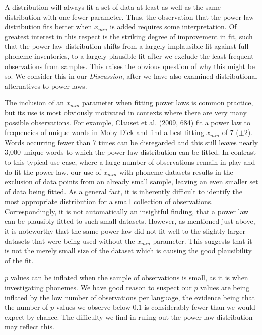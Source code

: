 A distribution will always fit a set of data at least as well as the same distribution with one fewer parameter. Thus, the observation that the power law distribution fits better when \(x_{min}\) is added requires some interpretation. Of greatest interest in this respect is the striking degree of improvement in fit, such that the power law distribution shifts from a largely implausible fit against full phoneme inventories, to a largely plausible fit after we exclude the least-frequent observations from samples. This raises the obvious question of why this might be so. We consider this in our \emph{Discussion}, after we have also examined distributional alternatives to power laws.

The inclusion of an \(x_{min}\) parameter when fitting power laws is common practice, but its use is most obviously motivated in contexts where there are very many possible observations. For example, Clauset et al. (2009, 684) fit a power law to frequencies of unique words in Moby Dick and find a best-fitting \(x_{min}\) of 7 (\(\pm2\)). Words occurring fewer than 7 times can be disregarded and this still leaves nearly 3,000 unique words to which the power law distribution can be fitted. In contrast to this typical use case, where a large number of observations remain in play and do fit the power law, our use of \(x_{min}\) with phoneme datasets results in the exclusion of data points from an already small sample, leaving an even smaller set of data being fitted. As a general fact, it is inherently difficult to identify the most appropriate distribution for a small collection of observations. Correspondingly, it is not automatically an insightful finding, that a power law can be plausibly fitted to such small datasets. However, as mentioned just above, it is noteworthy that the same power law did not fit well to the slightly larger datasets that were being used without the \(x_{min}\) parameter. This suggests that it is not the merely small size of the dataset which is causing the good plausibility of the fit.

\(p\) values can be inflated when the sample of observations is small, as it is when investigating phonemes. We have good reason to suspect our \(p\) values are being inflated by the low number of observations per language, the evidence being that the number of \(p\) values we observe below 0.1 is considerably fewer than we would expect by chance. The difficulty we find in ruling out the power law distribution may reflect this. \newline

